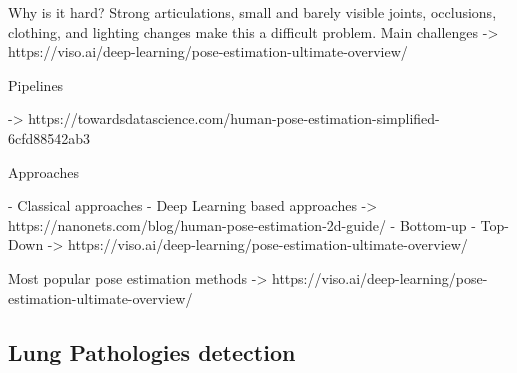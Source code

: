 Why is it hard?
Strong articulations, small and barely visible joints, occlusions, clothing, and lighting changes make this a difficult problem.
Main challenges -> https://viso.ai/deep-learning/pose-estimation-ultimate-overview/

Pipelines

-> https://towardsdatascience.com/human-pose-estimation-simplified-6cfd88542ab3

Approaches

- Classical approaches
- Deep Learning based approaches
-> https://nanonets.com/blog/human-pose-estimation-2d-guide/
- Bottom-up
- Top-Down
-> https://viso.ai/deep-learning/pose-estimation-ultimate-overview/


Most popular pose estimation methods
-> https://viso.ai/deep-learning/pose-estimation-ultimate-overview/


\subsection{Lung Pathologies detection}

